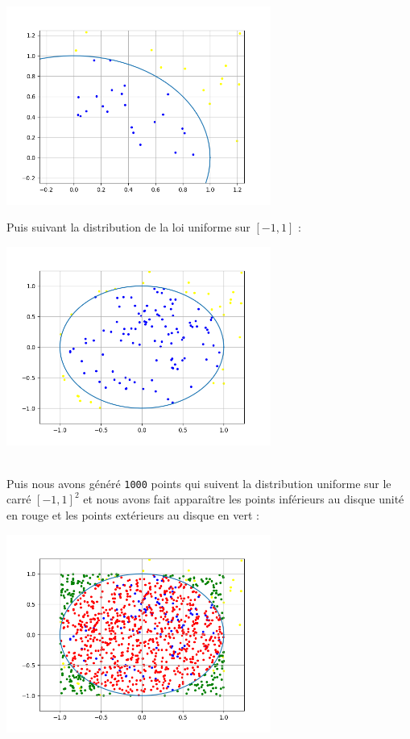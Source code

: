 \documentclass{article}
\begin{document}
\begin{center}
    \includegraphics[width=0.65\textwidth]{CercleExo6(1).png}
\end{center}

 Puis suivant la distribution de la loi uniforme sur $[-1,1]$ : 

\begin{center}
    \includegraphics[width=0.65\textwidth]{CercleExo6(2).png}
\end{center}

\\
Puis nous avons généré \texttt{1000} points qui suivent la distribution uniforme sur le carré $[-1,1]^2$ et nous avons fait apparaître les points inférieurs au disque unité en rouge et les points extérieurs au disque en vert :

\begin{center}
    \includegraphics[width=0.65\textwidth]{CercleExo6(3).png}
\end{center}
\end{document}
